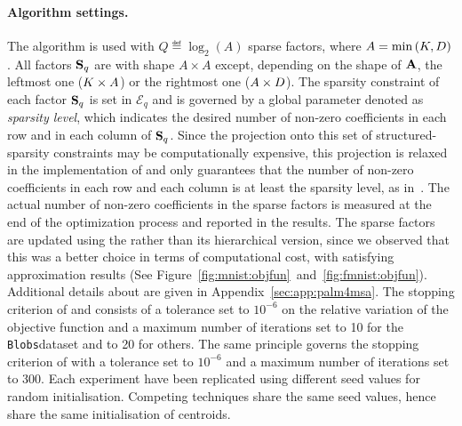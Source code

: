 \paragraph{Algorithm settings.} 
The \qkmeans algorithm is used with $Q\eqdef\log_2\left (A\right )$ sparse factors, where  $A=\min\left (K, D\right )$. 
All factors ${\mathbf{S}}_q$ are with shape $A \times A$ except, depending on the shape of ${\mathbf{A}}$, the leftmost one ($K\times A$) or the rightmost one ($A\times D$). 
The sparsity constraint of each factor ${\mathbf{S}}_q$ is set in $\mathcal{E}_q$ and is governed by a global parameter denoted as \textit{sparsity level}, which indicates the desired number of non-zero coefficients in each row and in each column of ${\mathbf{S}}_q$. 
Since the projection onto this set of structured-sparsity constraints may be computationally expensive, this projection is relaxed in the implementation of \palm and only guarantees that the number of non-zero coefficients in each row and each column is at least the sparsity level, as in~\cite{LeMagoarou2016Flexible}.
The actual number of non-zero coefficients in the sparse factors is measured at the end of the optimization process and reported in the results.
The sparse factors are updated using the \palm rather than its hierarchical version, since we observed that this was a better choice in terms of computational cost, with satisfying approximation results (See Figure~\ref{fig:mnist:objfun}~and~\ref{fig:fmnist:objfun}).
Additional details about \palm are given in Appendix~\ref{sec:app:palm4msa}.
The stopping criterion of \kmeans and \qkmeans consists of a tolerance set to $10^{-6}$ on the relative variation of the objective function and a maximum number of iterations set to 10 for the \texttt{Blobs}dataset and to 20 for others. The same principle governs the stopping criterion of \palm with a tolerance set to $10^{-6}$ and a maximum number of iterations set to 300. Each experiment have been replicated using different seed values for random initialisation. Competing techniques share the same seed values, hence share the same initialisation of centroids.

%


